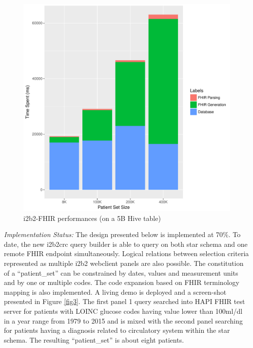 \documentclass{amia}
\begin{document}
\begin{figure}[h]
\centering
\includegraphics[scale=.6]{graph1.pdf}
	\caption{i2b2-FHIR performances (on a 5B Hive table)}
\label{fig2}
\end{figure}
\textit{Implementation Status: } The design presented below is implemented at 70\%. To date, the new i2b2crc query builder is able to query on both star schema and one remote FHIR endpoint simultaneously. Logical relations between selection criteria represented as multiple i2b2 webclient panels are also possible. The constitution of a ``patient\_set'' can be constrained by dates, values and measurement units and by one or multiple codes. The code expansion based on FHIR terminology mapping is also implemented. A living demo is deployed\cite{i2b2-fhir-demo} and a screen-shot presented in Figure \ref{fig3}. The first panel 1 query searched into HAPI FHIR test server for patients with LOINC glucose codes having value lower than 100ml/dl in a year range from 1979 to 2015 and is mixed with the second panel searching for patients having a diagnosis related to circulatory system within the star schema. The resulting ``patient\_set'' is about eight patients.
\end{document}
